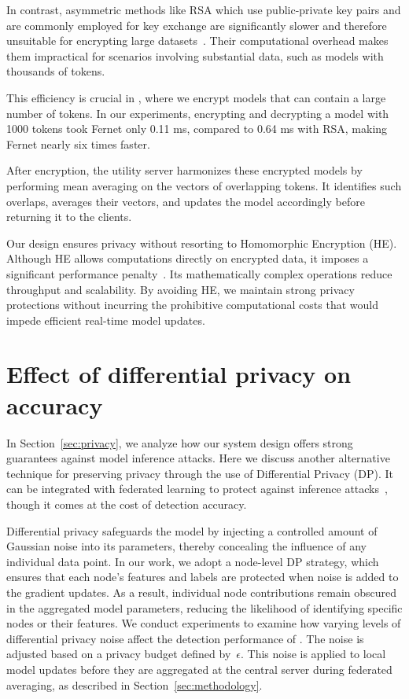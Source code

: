 In contrast, asymmetric methods like RSA which use public-private key pairs and are commonly employed for key exchange are significantly slower and therefore unsuitable for encrypting large datasets~\cite{menezes2018handbook}. Their computational overhead makes them impractical for scenarios involving substantial data, such as \wordvec models with thousands of tokens.

This efficiency is crucial in \Sys, where we encrypt \wordvec models that can contain a large number of tokens. In our experiments, encrypting and decrypting a \wordvec model with 1000 tokens took Fernet only 0.11 ms, compared to 0.64 ms with RSA, making Fernet nearly six times faster.

After encryption, the utility server harmonizes these encrypted models by performing mean averaging on the vectors of overlapping tokens. It identifies such overlaps, averages their vectors, and updates the model accordingly before returning it to the clients.

Our design ensures privacy without resorting to Homomorphic Encryption (HE). Although HE allows computations directly on encrypted data, it imposes a significant performance penalty~\cite{naehrig2011can}. Its mathematically complex operations reduce throughput and scalability. By avoiding HE, we maintain strong privacy protections without incurring the prohibitive computational costs that would impede efficient real-time model updates.

\section{Effect of differential privacy on accuracy}
\label{app:dp}

In Section~\ref{sec:privacy}, we analyze how our system design offers strong guarantees against model inference attacks. Here we discuss another alternative technique for preserving privacy through the use of Differential Privacy (DP). It can be integrated with federated learning to protect against inference attacks~\cite{lyu2020threats,nasr2019comprehensive,zari2021efficient}, though it comes at the cost of detection accuracy.

Differential privacy safeguards the model by injecting a controlled amount of Gaussian noise into its parameters, thereby concealing the influence of any individual data point. In our work, we adopt a node-level DP strategy, which ensures that each node’s features and labels are protected when noise is added to the gradient updates. As a result, individual node contributions remain obscured in the aggregated model parameters, reducing the likelihood of identifying specific nodes or their features. We conduct experiments to examine how varying levels of differential privacy noise affect the detection performance of \Sys. The noise is adjusted based on a privacy budget defined by~$\epsilon$. This noise is applied to local \gnnshort model updates before they are aggregated at the central server during federated averaging, as described in Section~\ref{sec:methodology}.

